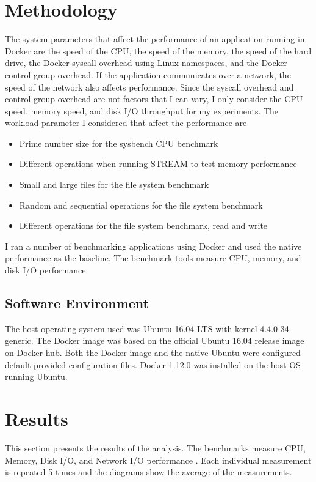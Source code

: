\documentclass[11pt]{article}
\begin{document}
\section{Methodology}
The system parameters that affect the performance of an application running in Docker are the speed of the CPU, the speed of the memory, the speed of the hard drive, the Docker syscall overhead using Linux namespaces, and the Docker control group overhead. If the application communicates over a network, the speed of the network also affects performance. Since the syscall overhead and control group overhead are not factors that I can vary, I only consider the CPU speed, memory speed, and disk I/O throughput for my experiments. The workload parameter I considered that affect the performance are 
\begin{itemize}
\item Prime number size for the sysbench CPU benchmark
\item Different operations when running STREAM to test memory performance
\item Small and large files for the file system benchmark
\item Random and sequential operations for the file system benchmark
\item Different operations for the file system benchmark, read and write
\end{itemize}
I ran a number of benchmarking applications using Docker and used the native performance as the baseline. The benchmark tools measure CPU, memory, and disk I/O performance. 

\subsection{Software Environment}
The host operating system used was Ubuntu 16.04 LTS with kernel 4.4.0-34-generic. 
The Docker image was based on the official Ubuntu 16.04 release image on Docker hub. 
Both the Docker image and the native Ubuntu were configured default provided configuration files. Docker 1.12.0 was installed on the host OS running Ubuntu. 

\section{Results}
This section presents the results of the analysis. The benchmarks measure CPU, Memory, Disk I/O, and Network I/O performance \cite{bukh}. Each individual measurement is repeated 5 
times and the diagrams show the average of the measurements. 
\end{document}
